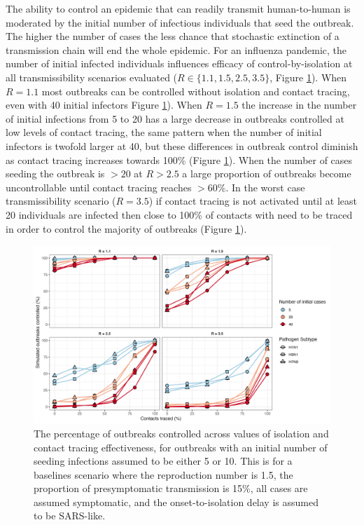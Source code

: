 \documentclass{article}
\begin{document}
The ability to control an epidemic that can readily transmit human-to-human is moderated by the initial number of infectious individuals that seed the outbreak. The higher the number of cases the less chance that stochastic extinction of a transmission chain will end the whole epidemic. For an influenza pandemic, the number of initial infected individuals influences efficacy of control-by-isolation at all transmissibility scenarios evaluated ($R \in \{1.1, 1.5, 2.5, 3.5\}$, Figure \ref{fig:prop-outbreak-control-num-init-cases}). When $R = 1.1$ most outbreaks can be controlled without isolation and contact tracing, even with 40 initial infectors Figure \ref{fig:prop-outbreak-control-num-init-cases}). When $R = 1.5$ the increase in the number of initial infections from 5 to 20 has a large decrease in outbreaks controlled at low levels of contact tracing, the same pattern when the number of initial infectors is twofold larger at 40, but these differences in outbreak control diminish as contact tracing increases towards 100\% (Figure \ref{fig:prop-outbreak-control-num-init-cases}). When the number of cases seeding the outbreak is $>20$ at $R>2.5$ a large proportion of outbreaks become uncontrollable until contact tracing reaches $>60\%$. In the worst case transmissibility scenario ($R = 3.5$) if contact tracing is not activated until at least 20 individuals are infected then close to 100\% of contacts with need to be traced in order to control the majority of outbreaks (Figure \ref{fig:prop-outbreak-control-num-init-cases}).  \\

\begin{figure}[ht]
\centering
\includegraphics[width=\textwidth]{../plots/prop_outbreak_control_num_init_cases.png}
\caption{The percentage of outbreaks controlled across values of isolation and contact tracing effectiveness, for outbreaks with an initial number of seeding infections assumed to be either 5 or 10. This is for a baselines scenario where the reproduction number is 1.5, the proportion of presymptomatic transmission is 15\%, all cases are assumed symptomatic, and the onset-to-isolation delay is assumed to be SARS-like.}
\label{fig:prop-outbreak-control-num-init-cases}
\end{figure}
\end{document}
